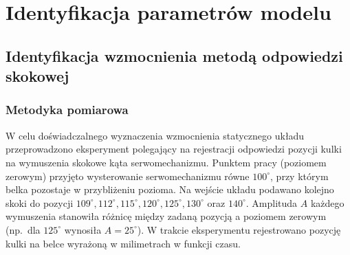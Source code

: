 \section{Identyfikacja parametrów modelu}



\subsection{Identyfikacja wzmocnienia metodą odpowiedzi skokowej}
 
\subsubsection{Metodyka pomiarowa}
 
W celu doświadczalnego wyznaczenia wzmocnienia statycznego układu przeprowadzono
eksperyment polegający na rejestracji odpowiedzi pozycji kulki na wymuszenia skokowe
kąta serwomechanizmu.
Punktem pracy (poziomem zerowym) przyjęto wysterowanie serwomechanizmu równe
$100^\circ$, przy którym belka pozostaje w przybliżeniu pozioma.
Na wejście układu podawano kolejno skoki do pozycji $109^\circ, 112^\circ, 115^\circ,
120^\circ, 125^\circ, 130^\circ$ oraz $140^\circ$.
Amplituda $A$ każdego wymuszenia stanowiła różnicę między zadaną pozycją a
poziomem zerowym (np.\ dla $125^\circ$ wynosiła $A = 25^\circ$).
W trakcie eksperymentu rejestrowano pozycję kulki na belce wyrażoną w milimetrach
w funkcji czasu.
 
